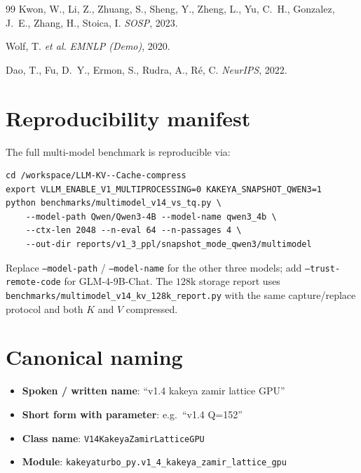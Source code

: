 \documentclass[11pt,a4paper]{article}
\theoremstyle{definition}
\theoremstyle{plain}
\begin{document}
\begin{thebibliography}{99}
Kwon, W., Li, Z., Zhuang, S., Sheng, Y., Zheng, L., Yu, C.~H., Gonzalez, J.~E., Zhang, H., Stoica, I.
\newblock \emph{SOSP}, 2023.

Wolf, T. \emph{et al.}
\newblock \emph{EMNLP (Demo)}, 2020.

Dao, T., Fu, D.~Y., Ermon, S., Rudra, A., R\'e, C.
\newblock \emph{NeurIPS}, 2022.

\end{thebibliography}

\appendix

\section{Reproducibility manifest}
\label{app:repro}

The full multi-model benchmark is reproducible via:
\begin{verbatim}
cd /workspace/LLM-KV--Cache-compress
export VLLM_ENABLE_V1_MULTIPROCESSING=0 KAKEYA_SNAPSHOT_QWEN3=1
python benchmarks/multimodel_v14_vs_tq.py \
    --model-path Qwen/Qwen3-4B --model-name qwen3_4b \
    --ctx-len 2048 --n-eval 64 --n-passages 4 \
    --out-dir reports/v1_3_ppl/snapshot_mode_qwen3/multimodel
\end{verbatim}
Replace \texttt{--model-path} / \texttt{--model-name} for the other
three models; add \texttt{--trust-remote-code} for GLM-4-9B-Chat.
The $128$k storage report uses
\texttt{benchmarks/multimodel\_v14\_kv\_128k\_report.py} with the
same capture/replace protocol and both $K$ and $V$ compressed.

\section{Canonical naming}
\label{app:naming}

\begin{itemize}[leftmargin=*]
  \item \textbf{Spoken / written name}: ``v1.4 kakeya zamir lattice GPU''
  \item \textbf{Short form with parameter}: e.g.\ ``v1.4 Q=152''
  \item \textbf{Class name}: \texttt{V14KakeyaZamirLatticeGPU}
  \item \textbf{Module}: \texttt{kakeyaturbo\_py.v1\_4\_kakeya\_zamir\_lattice\_gpu}
\end{itemize}
\end{document}
